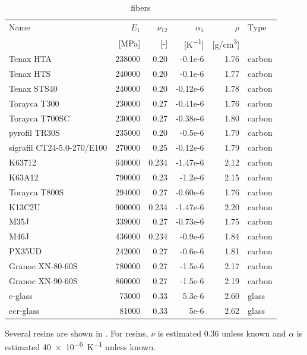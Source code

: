 \documentclass[a4paper,landscape,oneside,11pt,twocolumn]{memoir}
\begin{document}
\begin{table}[!htbp]
  \centering
  \caption{\label{tb:fibers}fibers}
  \begin{tabular}{lrrrrl}%
      Name & $E_1$ & $\nu_{12}$ & $\alpha_1$ & $\rho$ & Type\\
      & [\si{MPa}] & [-] & [\si{K^{-1}}] & [\si{g/cm^3}]\\
    \midrule
      Tenax HTA & 238000 & 0.20 & -0.1e-6 & 1.76 & carbon\\
      Tenax HTS & 240000 & 0.20 & -0.1e-6 & 1.77 & carbon\\
      Tenax STS40 & 240000 & 0.20 & -0.12e-6 & 1.78 & carbon\\
      Torayca T300 & 230000 & 0.27 & -0.41e-6 & 1.76 & carbon\\
      Torayca T700SC & 230000 & 0.27 & -0.38e-6 & 1.80 & carbon\\
      pyrofil TR30S & 235000 & 0.20 & -0.5e-6 & 1.79 & carbon\\
      sigrafil CT24-5.0-270/E100 & 270000 & 0.25 & -0.12e-6 & 1.79 & carbon\\
      K63712 & 640000 & 0.234 & -1.47e-6 & 2.12 & carbon\\
      K63A12 & 790000 & 0.23 & -1.2e-6 & 2.15 & carbon\\
      Torayca T800S & 294000 & 0.27 & -0.60e-6 & 1.76 & carbon\\
      K13C2U & 900000 & 0.234 & -1.47e-6 & 2.20 & carbon\\
      M35J & 339000 & 0.27 & -0.73e-6 & 1.75 & carbon\\
      M46J & 436000 & 0.234 & -0.9e-6 & 1.84 & carbon\\
      PX35UD & 242000 & 0.27 & -0.6e-6 & 1.81 & carbon\\
      Granoc XN-80-60S & 780000 & 0.27 & -1.5e-6 & 2.17 & carbon\\
      Granoc XN-90-60S & 860000 & 0.27 & -1.5e-6 & 2.19 & carbon\\
      e-glass & 73000 & 0.33 & 5.3e-6 & 2.60 & glass\\
      ecr-glass & 81000 & 0.33 & 5e-6 & 2.62 & glass\\
  \end{tabular}
\end{table}

Several resins are shown in . For resins, $\nu$ is estimated
0.36 unless known and $\alpha$ is estimated \SI{40e-6}{K^{-1}} unless known.
\end{document}
